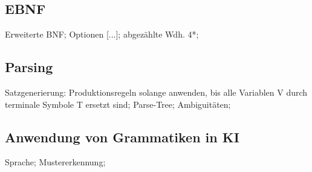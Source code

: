 \documentclass[german,color,6pt]{latex4ei/latex4ei_sheet}
\begin{document}
\begin{sectionbox}
\subsection{EBNF}
Erweiterte BNF; Optionen [...]; abgezählte Wdh. 4*;
\end{sectionbox}

\begin{sectionbox}
\subsection{Parsing}
Satzgenerierung: Produktionsregeln solange anwenden, bis alle Variablen V durch terminale Symbole T ersetzt sind; Parse-Tree; Ambiguitäten;
\end{sectionbox}

\begin{sectionbox}
\subsection{Anwendung von Grammatiken in KI}
Sprache; Mustererkennung;
\end{sectionbox}
\end{document}
